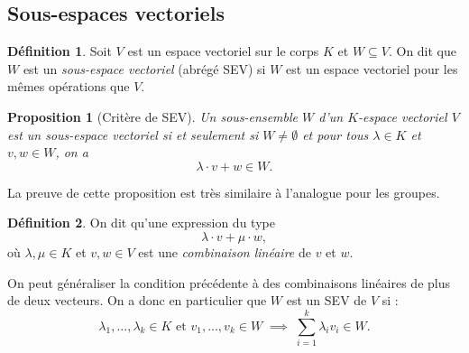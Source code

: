 \documentclass[oneside,12pt,french,table]{book}
\newtheorem{prop}{Proposition}[section]
\theoremstyle{definition}
\theoremstyle{definition}
\theoremstyle{definition}
\newtheorem{definition}{Définition}[chapter]
\begin{document}
\subsection{Sous-espaces vectoriels}
    \begin{definition}
        Soit $V$ est un espace vectoriel sur le corps $K$ et $W \subseteq V$. On dit que $W$ est un \textit{sous-espace vectoriel} (abrégé SEV) si $W$ est un espace vectoriel pour les mêmes opérations que $V$.
    \end{definition}
    \begin{prop}[Critère de SEV]
        Un sous-ensemble $W$ d'un $K$-espace vectoriel $V$ est un sous-espace vectoriel si et seulement si $W \neq \emptyset$ et pour tous $\lambda \in K$ et $v, w \in W$, on a
        $$
        \lambda \cdot v + w \in W .
        $$
    \end{prop}
    \noindent La preuve de cette proposition est très similaire à l'analogue pour les groupes.
    \begin{definition}
        On dit qu'une expression du type
        $$
        \lambda \cdot v+\mu \cdot w,
        $$
        où $\lambda, \mu \in K$ et $v, w \in V$ est une \textit{combinaison linéaire} de $v$ et $w$.
    \end{definition}
    \noindent On peut généraliser la condition précédente à des combinaisons linéaires de plus de deux vecteurs. On a donc en particulier que $W$ est un SEV de $V$ si :
    $$
    \lambda_1,...,\lambda_k \in K \text { et } v_1,...,v_k \in W \; \implies \; \sum_{i=1}^{k} \lambda_{i} v_{i} \in W.
    $$
    
\end{document}
